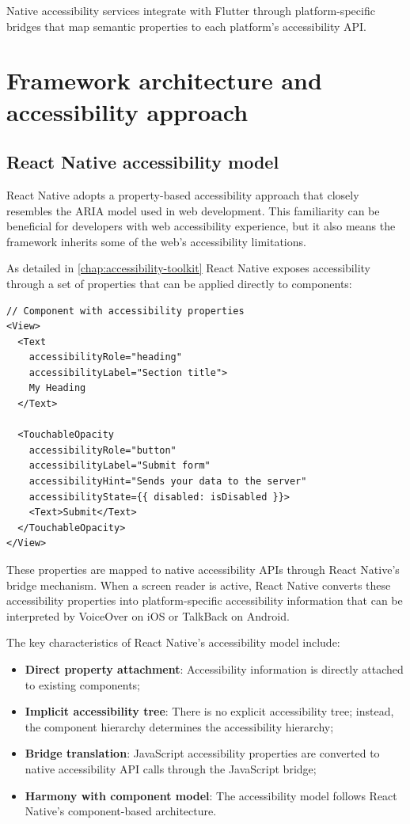 Native accessibility services integrate with Flutter through platform-specific bridges that map semantic properties to each platform's accessibility API.

\section{Framework architecture and accessibility approach}

\subsection{React Native accessibility model}
React Native adopts a property-based accessibility approach that closely resembles the ARIA model used in web development. This familiarity can be beneficial for developers with web accessibility experience, but it also means the framework inherits some of the web's accessibility limitations.

As detailed in \ref{chap:accessibility-toolkit} React Native exposes accessibility through a set of properties that can be applied directly to components:

\begin{lstlisting}[style=ReactNativeStyle, caption=React Native accessibility property model]
// Component with accessibility properties
<View>
  <Text 
    accessibilityRole="heading" 
    accessibilityLabel="Section title">
    My Heading
  </Text>
  
  <TouchableOpacity
    accessibilityRole="button"
    accessibilityLabel="Submit form"
    accessibilityHint="Sends your data to the server"
    accessibilityState={{ disabled: isDisabled }}>
    <Text>Submit</Text>
  </TouchableOpacity>
</View>
\end{lstlisting}

These properties are mapped to native accessibility APIs through React Native's bridge mechanism. When a screen reader is active, React Native converts these accessibility properties into platform-specific accessibility information that can be interpreted by VoiceOver on iOS or TalkBack on Android.

The key characteristics of React Native's accessibility model include:

\begin{itemize}
    \item \textbf{Direct property attachment}: Accessibility information is directly attached to existing components;
    \item \textbf{Implicit accessibility tree}: There is no explicit accessibility tree; instead, the component hierarchy determines the accessibility hierarchy;
    \item \textbf{Bridge translation}: JavaScript accessibility properties are converted to native accessibility API calls through the JavaScript bridge;
    \item \textbf{Harmony with component model}: The accessibility model follows React Native's component-based architecture.
\end{itemize}

